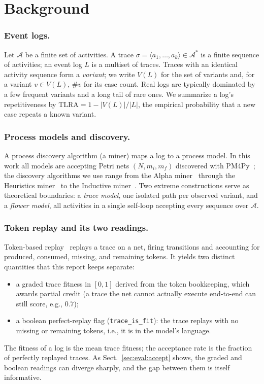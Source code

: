 \documentclass[runningheads]{llncs}
\begin{document}
\section{Background}
\label{sec:background}

\subsubsection{Event logs.}
Let $\mathcal{A}$ be a finite set of activities. A trace $\sigma=\langle a_1,\dots,a_k\rangle\in\mathcal{A}^{*}$ is a finite sequence of activities; an event log $L$ is a multiset of traces. Traces with an identical activity sequence form a \emph{variant}; we write $V(L)$ for the set of variants and, for a variant $v\in V(L)$, $\#v$ for its case count. Real logs are typically dominated by a few frequent variants and a long tail of rare ones. We summarize a log's repetitiveness by $\mathrm{TLRA}=1-|V(L)|/|L|$, the empirical probability that a new case repeats a known variant.

\subsubsection{Process models and discovery.}
A process discovery algorithm (a miner) maps a log to a process model. In this work all models are accepting Petri nets $(N,m_i,m_f)$ discovered with PM4Py~\cite{berti2019pm4py}; the discovery algorithms we use range from the Alpha miner~\cite{vanderaalst2004alpha} through the Heuristics miner~\cite{weijters2006hm} to the Inductive miner~\cite{leemans2013im,leemans2014imf}. Two extreme constructions serve as theoretical boundaries: a \emph{trace model}, one isolated path per observed variant, and a \emph{flower model}, all activities in a single self-loop accepting every sequence over $\mathcal{A}$.

\subsubsection{Token replay and its two readings.}
Token-based replay~\cite{rozinat2008conformance} replays a trace on a net, firing transitions and accounting for produced, consumed, missing, and remaining tokens. It yields two distinct quantities that this report keeps separate:
\begin{itemize}
  \item a graded trace fitness in $[0,1]$ derived from the token bookkeeping, which awards partial credit (a trace the net cannot actually execute end-to-end can still score, e.g., $0.7$);
  \item a boolean perfect-replay flag (\texttt{trace\_is\_fit}): the trace replays with no missing or remaining tokens, i.e., it is in the model's language.
\end{itemize}
The fitness of a log is the mean trace fitness; the acceptance rate is the fraction of perfectly replayed traces. As Sect.~\ref{sec:eval:accept} shows, the graded and boolean readings can diverge sharply, and the gap between them is itself informative.
\end{document}

